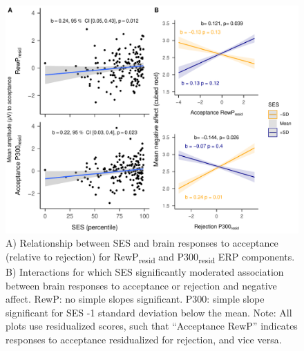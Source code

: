 \documentclass[
  man,floatsintext]{apa7}
\begin{document}
\begin{figure}
\centering
\includegraphics{BUDS_tables_and_figures_working_files/figure-latex/unnamed-chunk-14-1.pdf}
\caption{\label{fig:unnamed-chunk-14}A) Relationship between SES and brain responses to acceptance (relative to rejection) for RewP\textsubscript{resid} and P300\textsubscript{resid} ERP components. B) Interactions for which SES significantly moderated association between brain responses to acceptance or rejection and negative affect. RewP: no simple slopes significant. P300: simple slope significant for SES -1 standard deviation below the mean. Note: All plots use residualized scores, such that ``Acceptance RewP'' indicates responses to acceptance residualized for rejection, and vice versa.}
\end{figure}
\end{document}
